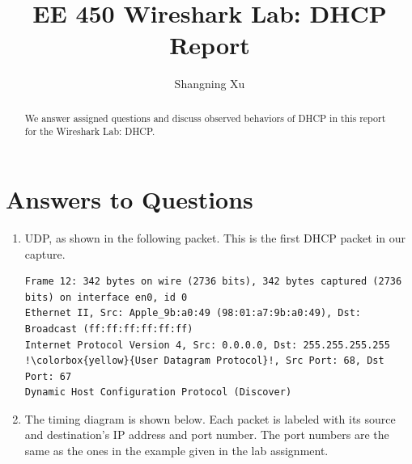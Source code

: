 \documentclass{article}
\title{EE 450 Wireshark Lab: DHCP Report}
\author{Shangning Xu}
\begin{document}
\maketitle
\newpage

\begin{abstract}
    We answer assigned questions and discuss observed behaviors of DHCP in this report for the Wireshark Lab: DHCP.
\end{abstract}

\section{Answers to Questions}

\begin{enumerate}
    \item UDP, as shown in the following packet. This is the first DHCP packet in our capture.
\begin{verbatim}
Frame 12: 342 bytes on wire (2736 bits), 342 bytes captured (2736 bits) on interface en0, id 0
Ethernet II, Src: Apple_9b:a0:49 (98:01:a7:9b:a0:49), Dst: Broadcast (ff:ff:ff:ff:ff:ff)
Internet Protocol Version 4, Src: 0.0.0.0, Dst: 255.255.255.255
!\colorbox{yellow}{User Datagram Protocol}!, Src Port: 68, Dst Port: 67
Dynamic Host Configuration Protocol (Discover)
\end{verbatim}

    \item The timing diagram is shown below. Each packet is labeled with its source and destination's IP address and port number. The port numbers are the same as the ones in the example given in the lab assignment.
    
\end{enumerate}
\end{document}
